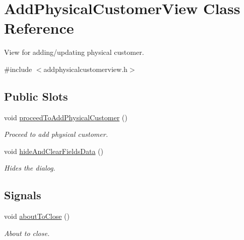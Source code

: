 \hypertarget{class_add_physical_customer_view}{\section{\-Add\-Physical\-Customer\-View \-Class \-Reference}
\label{class_add_physical_customer_view}
}


\-View for adding/updating physical customer.  




{\ttfamily \#include $<$addphysicalcustomerview.\-h$>$}

\subsection*{\-Public \-Slots}
\begin{DoxyCompactItemize}
\item 
void \hyperlink{class_add_physical_customer_view_a044a8e26fc510af7b6a31ed2b14db396}{proceed\-To\-Add\-Physical\-Customer} ()
\begin{DoxyCompactList}\small\item\em \-Proceed to add physical customer. \end{DoxyCompactList}\item 
void \hyperlink{class_add_physical_customer_view_ac104f3df08e8231464b10450f0f0b42f}{hide\-And\-Clear\-Fields\-Data} ()
\begin{DoxyCompactList}\small\item\em \-Hides the dialog. \end{DoxyCompactList}\end{DoxyCompactItemize}
\subsection*{\-Signals}
\begin{DoxyCompactItemize}
\item 
void \hyperlink{class_add_physical_customer_view_ac3f3104c437747327254f4c060b21c0b}{about\-To\-Close} ()
\begin{DoxyCompactList}\small\item\em \-About to close. \end{DoxyCompactList}\end{DoxyCompactItemize}
